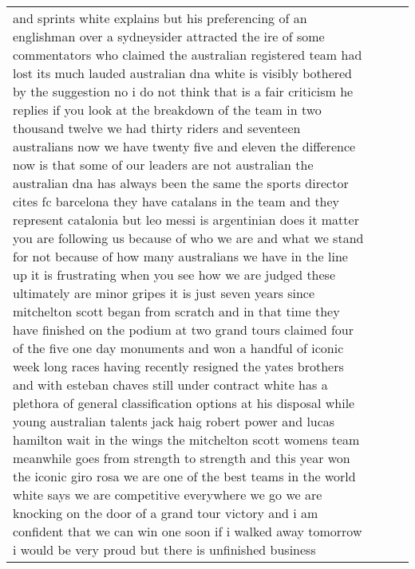 \documentclass[]{article}
\begin{document}
\begin{table}[!h]
{\begin{tabular}[t]{llll}
and sprints white explains but his preferencing of an englishman over a sydneysider attracted the ire of some commentators who claimed the australian registered team had lost its much lauded australian dna white is visibly bothered by the suggestion no i do not think that is a fair criticism he replies if you look at the breakdown of the team in two thousand twelve we had thirty riders and seventeen australians now we have twenty five and eleven the difference now is that some of our leaders are not australian the australian dna has always been the same the sports director cites fc barcelona they have catalans in the team and they represent catalonia but leo messi is argentinian does it matter you are following us because of who we are and what we stand for not because of how many australians we have in the line up it is frustrating when you see how we are judged these ultimately are minor gripes it is just seven years since mitchelton scott began from scratch and in that time they have finished on the podium at two grand tours claimed four of the five one day monuments and won a handful of iconic week long races having recently resigned the yates brothers and with esteban chaves still under contract white has a plethora of general classification options at his disposal while young australian talents jack haig robert power and lucas hamilton wait in the wings the mitchelton scott womens team meanwhile goes from strength to strength and this year won the iconic giro rosa we are one of the best teams in the world white says we are competitive everywhere we go we are knocking on the door of a grand tour victory and i am confident that we can win one soon if i walked away tomorrow i would be very proud but there is unfinished business\\

\end{tabular}}
\end{table}
\end{document}
